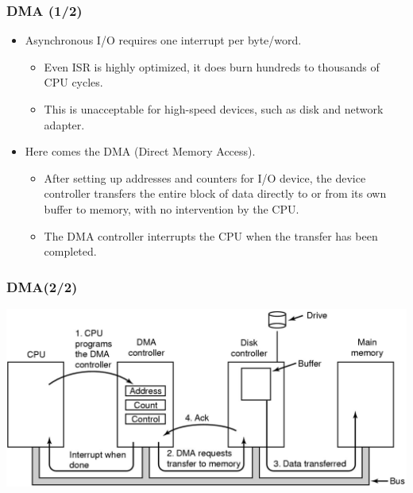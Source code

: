 \documentclass[CJKutf8,xcolor=pdftex,dvipsnames,table]{beamer}
\begin{document}
\begin{CJK*}{UTF8}{song}
  \begin{frame}
    \frametitle{DMA (1/2)} \pause
    \begin{itemize}
    \item{Asynchronous I/O requires one interrupt per byte/word.} \pause
      \begin{itemize}
      \item{Even ISR is highly optimized, it does burn hundreds to thousands of CPU cycles.} \pause
      \item{This is unacceptable for high-speed devices, such as disk and network adapter.} \pause
      \end{itemize}
    \item{Here comes the DMA (Direct Memory Access).} \pause
      \begin{itemize}
      \item{After setting up addresses and counters for I/O device, the device controller transfers the entire block of data directly to or from its own buffer to memory, with no intervention by the CPU. } \pause
      \item{The DMA controller interrupts the CPU when the transfer has been completed.}
      \end{itemize}
    \end{itemize}
  \end{frame}

  \begin{frame}
    \frametitle{DMA(2/2)} \pause
    \begin{center}
      \includegraphics[scale=0.5]{mosv2f5-4}
    \end{center}
  \end{frame}

\fi



\end{CJK*}
\end{document}
